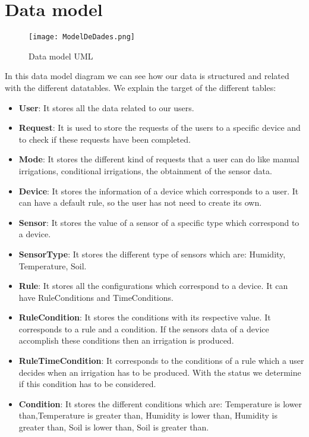 \documentclass[11pt,a4paper]{article}
\begin{document}
\newpage

\section{Data model}
\begin{figure}[hbtp]
\centering
\texttt{[image: ModelDeDades.png]}
\caption{Data model UML}
\end{figure}
In this data model diagram we can see how our data is structured and related with the different datatables. We explain the target of the different tables:

\begin{itemize}
\item \textbf{User}: It stores all the data related to our users.

\item \textbf{Request}: It is used to store the requests of the users  to a specific device and to check if these requests have been completed. 

\item \textbf{Mode}: It stores the different kind of requests that a user can do  like manual irrigations, conditional irrigations, the obtainment of the sensor data.

\item \textbf{Device}: It stores the information of a device which corresponds to a user. It can have a default rule, so the user has not need to create its own. 

\item \textbf{Sensor}: It stores the value of a sensor of a specific type which correspond to a device.

\item \textbf{SensorType}: It stores the different type of sensors which are: Humidity, Temperature, Soil.

\item \textbf{Rule}: It stores all the configurations which correspond to a device. It can have RuleConditions and TimeConditions.

\item \textbf{RuleCondition}: It stores the conditions  with its respective value. It corresponds to a rule and a condition. If the sensors data of a device accomplish these conditions then an irrigation is produced.  

\item \textbf{RuleTimeCondition}: It corresponds to the conditions of a rule which a user decides when an irrigation has to be produced.  With the status we determine if this condition has to be considered.

\item \textbf{Condition}: It stores the different conditions which are: Temperature is lower than,Temperature is greater than, Humidity is lower than,  Humidity is greater than, Soil is lower than, Soil is greater than.
\end{itemize}
\end{document}
